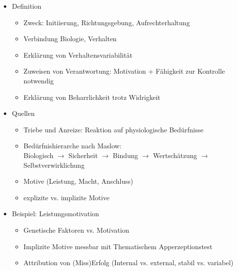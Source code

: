 \documentclass[11pt, paper=a4, twocolumn]{scrartcl}
\begin{document}
	\begin{itemize}
		\item Definition
			\begin{itemize}
				\item Zweck: Initiierung, Richtungsgebung, 
					Aufrechterhaltung
				\item Verbindung Biologie, Verhalten
				\item Erklärung von Verhaltensvariabilität
				\item Zuweisen von Verantwortung: Motivation + Fähigkeit 
					zur Kontrolle notwendig
				\item Erklärung von Beharrlichkeit trotz Widrigkeit
			\end{itemize}

		\item Quellen
			\begin{itemize}
				\item Triebe und Anreize: Reaktion auf physiologische 
					Bedürfnisse
				\item Bedürfnishierarche nach Maslow:\\
					Biologisch $\rightarrow$ Sicherheit $\rightarrow$ 
					Bindung $\rightarrow$ Wertschätzung $\rightarrow$ 
					Selbstverwirklichung
				\item Motive (Leistung, Macht, Anschluss)
				\item explizite vs. implizite Motive
			\end{itemize}

		\item Beispiel: Leistungsmotivation
			\begin{itemize}
				\item Genetische Faktoren vs. Motivation
				\item Implizite Motive messbar mit Thematischem 
					Apperzeptionstest
				\item Attribution von (Miss)Erfolg (Internal vs. external, 
					stabil vs. variabel)
			\end{itemize}



\end{itemize}
\end{document}
